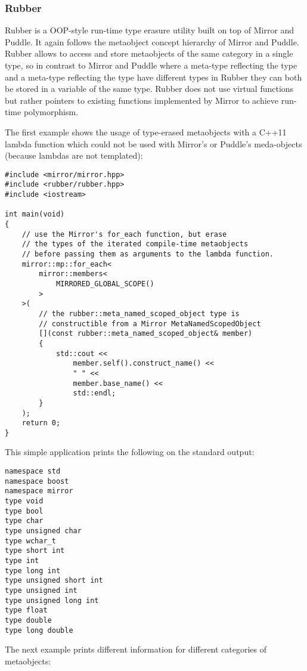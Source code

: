 \subsubsection{Rubber}

Rubber is a OOP-style run-time type erasure utility built on top
of Mirror and Puddle. It again follows the metaobject concept hierarchy of Mirror and Puddle.
Rubber allows to access and store metaobjects of the same category in a single
type, so in contrast to Mirror and Puddle where a meta-type reflecting the \verb@int@
type and a meta-type reflecting the \verb@double@ type have different types
in Rubber they can both be stored in a variable of the same type.
Rubber does not use virtual functions but rather pointers to existing
functions implemented by Mirror to achieve run-time polymorphism.

The first example shows the usage of type-erased metaobjects with a C++11
lambda function which could not be used with Mirror's or Puddle's meda-objects
(because lambdas are not templated):

\begin{lstlisting}
#include <mirror/mirror.hpp>
#include <rubber/rubber.hpp>
#include <iostream>

int main(void)
{
    // use the Mirror's for_each function, but erase
    // the types of the iterated compile-time metaobjects
    // before passing them as arguments to the lambda function.
    mirror::mp::for_each<
        mirror::members<
            MIRRORED_GLOBAL_SCOPE()
        >
    >(
        // the rubber::meta_named_scoped_object type is
        // constructible from a Mirror MetaNamedScopedObject
        [](const rubber::meta_named_scoped_object& member)
        {
            std::cout <<
                member.self().construct_name() <<
                " " <<
                member.base_name() <<
                std::endl;
        }
    );
    return 0;
}
\end{lstlisting}

This simple application prints the following on the standard output:

\begin{verbatim}
namespace std
namespace boost
namespace mirror
type void
type bool
type char
type unsigned char
type wchar_t
type short int
type int
type long int
type unsigned short int
type unsigned int
type unsigned long int
type float
type double
type long double
\end{verbatim}

The next example prints different information for different categories
of metaobjects:

